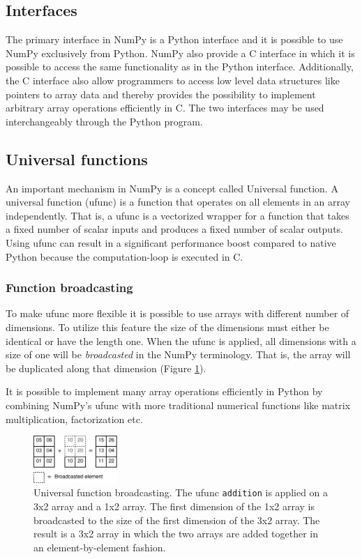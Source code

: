 \documentclass[10pt]{article}
\begin{document}
\subsection{Interfaces}
The primary interface in NumPy is a Python interface and it is possible to use NumPy exclusively from Python. NumPy also provide a C interface in which it is possible to access the same functionality as in the Python interface. Additionally, the C interface also allow programmers to access low level data structures like pointers to array data and thereby provides the possibility to implement arbitrary array operations efficiently in C. The two interfaces may be used interchangeably through the Python program.

\subsection{Universal functions}
An important mechanism in NumPy is a concept called Universal function. A universal function (ufunc) is a function that operates on all elements in an array independently. That is, a ufunc is a vectorized wrapper for a function that takes a fixed number of scalar inputs and produces a fixed number of scalar outputs. Using ufunc can result in a significant performance boost compared to native Python because the computation-loop is executed in C.

\subsubsection{Function broadcasting}
To make ufunc more flexible it is possible to use arrays with different number of dimensions. To utilize this feature the size of the dimensions must either be identical or have the length one. When the ufunc is applied, all dimensions with a size of one will be \emph{broadcasted} in the NumPy terminology. That is, the array will be duplicated along that dimension (Figure \ref{fig:ufunc_broadcast}).

It is possible to implement many array operations efficiently in Python by combining NumPy's ufunc with more traditional numerical functions like matrix multiplication, factorization etc.

\begin{figure}
 \centering
 \includegraphics[width=120px]{gfx/ufunc_broadcast}
 \caption{Universal function broadcasting. The ufunc \texttt{addition} is applied on a 3x2 array and a 1x2 array. The first dimension of the 1x2 array is broadcasted to the size of the first dimension of the 3x2 array. The result is a 3x2 array in which the two arrays are added together in an element-by-element fashion.}
 \label{fig:ufunc_broadcast}
\end{figure}
\end{document}
